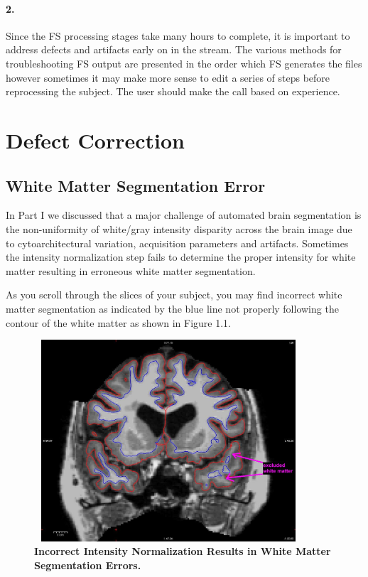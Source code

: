\documentclass[paper=a4, fontsize=11pt]{scrartcl} %
\numberwithin{equation}{section} %
\numberwithin{figure}{section} %
\numberwithin{table}{section} %
\begin{document}
\paragraph{2.} Since the FS processing stages take many hours to complete, it is important to address defects and artifacts early on in the stream.  The various methods for troubleshooting FS output are presented in the order which FS generates the files however sometimes it may make more sense to edit a series of steps before reprocessing the subject.  The user should make the call based on experience.


\section{Defect Correction}
\subsection{White Matter Segmentation Error}\label{ss:wser} In Part I we discussed that a major challenge of automated brain segmentation is the non-uniformity of white/gray intensity disparity across the brain image due to cytoarchitectural variation, acquisition parameters and artifacts.  Sometimes the intensity normalization step fails to determine the proper intensity for white matter resulting in erroneous white matter segmentation. 

As you scroll through the slices of your subject, you may find incorrect white matter segmentation as indicated by the blue line not properly following the contour of the white matter as shown in Figure 1.1.

\begin{figure}[h]
\includegraphics[width=10cm, height=7.5cm]{FS_cp_before}
\caption{\textbf{Incorrect Intensity Normalization Results in White Matter \mbox{Segmentation} Errors.}}
\end{figure}
\end{document}
